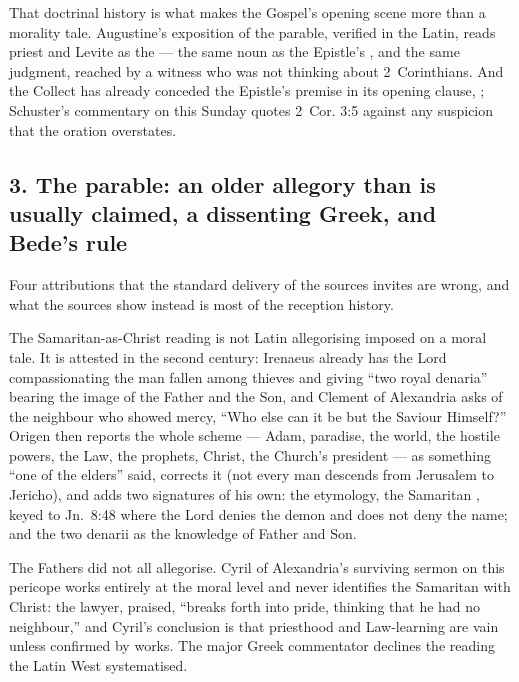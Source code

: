 That doctrinal history is what makes the Gospel's opening scene more than a
morality tale. Augustine's exposition of the parable, verified in the Latin,
reads priest and Levite as the  --- the same noun as the
Epistle's , and the same judgment, reached by a
witness who was not thinking about 2~Corinthians. And the Collect has already
conceded the Epistle's premise in its opening clause, ; Schuster's
commentary on this Sunday quotes 2~Cor. 3:5 against any suspicion that the
oration overstates.

\subsection*{3. The parable: an older allegory than is usually claimed, a dissenting Greek, and Bede's rule}

Four attributions that the standard delivery of the sources invites are
wrong, and what the sources show instead is most of the reception history.

The Samaritan-as-Christ reading is not Latin allegorising imposed on a moral
tale. It is attested in the second century: Irenaeus already has the Lord
compassionating the man fallen among thieves and giving ``two royal
denaria'' bearing the image of the Father and the Son, and Clement of
Alexandria asks of the neighbour who showed mercy, ``Who else can it be but
the Saviour Himself?'' Origen then reports the whole scheme --- Adam,
paradise, the world, the hostile powers, the Law, the prophets, Christ, the
Church's president --- as something ``one of the elders'' said, corrects it
(not every man descends from Jerusalem to Jericho), and adds two signatures of
his own: the etymology, the Samaritan , keyed
to Jn.~8:48 where the Lord denies the demon and does not deny the name; and
the two denarii as the knowledge of Father and Son.

The Fathers did not all allegorise. Cyril of Alexandria's surviving sermon on
this pericope works entirely at the moral level and never identifies the
Samaritan with Christ: the lawyer, praised, ``breaks forth into pride,
thinking that he had no neighbour,'' and Cyril's conclusion is that priesthood
and Law-learning are vain unless confirmed by works. The major Greek
commentator declines the reading the Latin West systematised.

